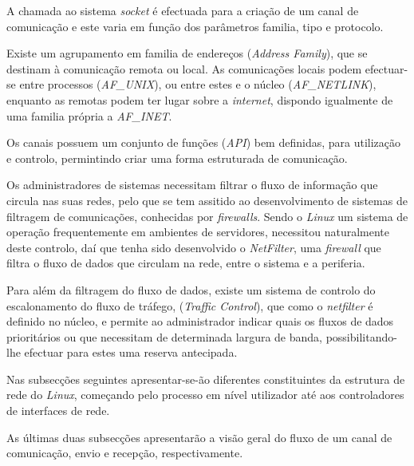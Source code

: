 A chamada ao sistema \textit{socket} é efectuada para a criação de um canal de comunicação e este varia em função dos parâmetros familia, tipo e protocolo.

Existe um agrupamento em familia de endereços (\textit{Address Family}), que se destinam à comunicação remota ou local.
As comunicações locais podem efectuar-se entre processos (\textit{AF\_UNIX}), ou entre estes e o núcleo (\textit{AF\_NETLINK}), enquanto as remotas podem ter lugar sobre a \textit{internet}, dispondo igualmente de uma familia própria a \textit{AF\_INET}.

Os canais possuem um conjunto de funções (\textit{API}) bem definidas, para utilização e controlo, permintindo criar uma forma estruturada de comunicação.

Os administradores de sistemas necessitam filtrar o fluxo de informação que circula nas suas redes, pelo que se tem assitido ao desenvolvimento de sistemas de filtragem de comunicações, conhecidas por \textit{firewalls}.
Sendo o \textit{Linux} um sistema de operação frequentemente em ambientes de servidores, necessitou naturalmente deste controlo, daí que tenha sido desenvolvido o \textit{NetFilter}, uma \textit{firewall} que \color{red}filtra \color{black}o fluxo de dados que circulam na rede, entre o sistema e a periferia.

Para além da filtragem do fluxo de dados, existe um sistema de controlo do escalonamento do fluxo de tráfego, (\textit{Traffic Control}), que como o \textit{netfilter} é definido no núcleo, e permite ao administrador indicar quais os fluxos de dados prioritários ou que necessitam de determinada largura de banda, possibilitando-lhe efectuar para estes uma reserva antecipada.
 
Nas subsecções seguintes apresentar-se-ão diferentes constituintes da estrutura de rede do \textit{Linux}, começando pelo processo em nível utilizador até aos controladores de interfaces de rede.

\color{red}As últimas duas subsecções apresentarão a visão geral do fluxo de um canal de comunicação, envio e recepção, respectivamente.\color{black}



